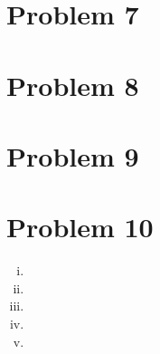 \documentclass[11pt]{article} %
\begin{document}
\section*{Problem 7}

\section*{Problem 8}

\section*{Problem 9}

\section*{Problem 10}
\begin{enumerate}[i.)]
\item
\item
\item
\item
\item
\end{enumerate}
\end{document}
